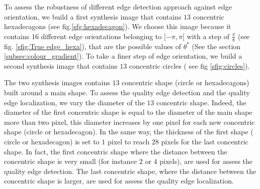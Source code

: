 \documentclass[twoside]{article}
\begin{document}
 To assess the robustness of different edge detection approach against edge orientation, we build a first synthesis image that contains $13$ concentric hexadecagons (see fig.\ref{sfg:hexadecagon}). We choose this image because it contains 16 different edge orientations belonging to $[-\pi,\pi[$ with a step of $\frac{\pi}{8}$ (see fig. \ref{sfig:True edge_hexa}), that are the possible values of $\theta^{*}$ (See the section \ref{subsec:colour_gradient}).
 To take a finer step of edge orientation, we build a second synthesis image that contains $13$ concentric circles ( see fig \ref{sfig:circles}).
 
 The two synthesis images contains $13$ concentric shape (circle or hexadecagons) built around a main shape. To assess the quality edge detection and the quality edge localization, we vary the diameter of the $13$ concentric shape. Indeed,  the diameter of the first concentric shape is equal to the diameter of the main shape more than two pixel, this diameter increases by one pixel for each new concentric shape (circle or hexadecagon). In the same way, the thickness of the first shape ( circle or hexadecagon) is set to $1$ pixel to  reach $28$ pixels for the last concentric shape. 
 In fact, the first concentric shape where the distance between the concentric shape is very small (for instance $2$ or $4$ pixels), are used for assess the quality edge detection. The last concentric shape, where the distance between the concentric shape is larger, are used for assess the quality edge localization.
\end{document}
